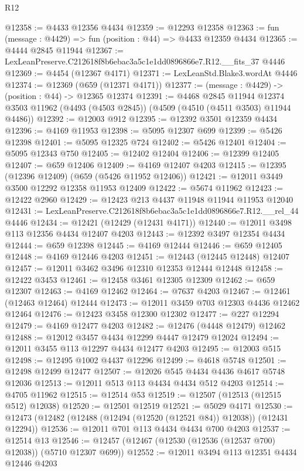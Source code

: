 \begin{lexlean}{R12}
\begin{coremodule}
@12358 := @4433 @12356 @4434
@12359 := @12293 @12358
@12363 := fun (message : @4429) => fun (position : @44) => @4433 @12359 @4434
@12365 := @4444 @2845 @11944
@12367 := LexLeanPreserve.C212618f8b6ebac3a5c1e1dd0896866e7.R12.__fits_37 @4446
@12369 := @4454 (@12367 @4171)
@12371 := LexLeanStd.Blake3.wordAt @4446
@12374 := @12369 (@659 (@12371 @4171))
@12377 := (message : @4429) -> (position : @44) -> @12365 @12374
@12391 := @4468
    @2845
    @11944
    @12374
    @3503
    @11962
    (@4493 (@4503 @2845))
    (@4509 (@4510 (@4511 @3503) @11944 @4486))
@12392 := @12003 @912
@12395 := @12392 @3501 @12359 @4434
@12396 := @4169 @11953
@12398 := @5095 @12307 @699
@12399 := @5426 @12398
@12401 := @5095 @12325 @724
@12402 := @5426 @12401
@12404 := @5095 @12343 @750
@12405 := @12402 @12404
@12406 := @12399 @12405
@12407 := @659 @12406
@12409 := @4169 @12407 @4203
@12415 := @12395 (@12396 @12409) (@659 (@5426 @11952 @12406))
@12421 := @12011 @3449 @3500 @12292 @12358 @11953 @12409
@12422 := @5674 @11962
@12423 := @12422 @2960
@12429 := @12423 @213 @4437 @11948 @11944 @11953 @12040
@12431 := LexLeanPreserve.C212618f8b6ebac3a5c1e1dd0896866e7.R12.__rel_44 @4446
@12434 := @12421 (@12429 (@12431 @4171))
@12440 := @12011 @3498 @113 @12356 @4434 @12407 @4203
@12443 := @12392 @3497 @12354 @4434
@12444 := @659 @12398
@12445 := @4169 @12444
@12446 := @659 @12405
@12448 := @4169 @12446 @4203
@12451 := @12443 (@12445 @12448) @12407
@12457 := @12011 @3462 @3496 @12310 @12353 @12444 @12448
@12458 := @12422 @3453
@12461 := @12458 @3461 @12305 @12309
@12462 := @659 @12307
@12463 := @4169 @12462
@12464 := @7637 @4203
@12467 := @12461 (@12463 @12464) @12444
@12473 := @12011 @3459 @703 @12303 @4436 @12462 @12464
@12476 := @12423 @3458 @12300 @12302
@12477 := @227 @12294
@12479 := @4169 @12477 @4203
@12482 := @12476 (@4448 @12479) @12462
@12488 := @12012 @3457 @4434 @12299 @4447 @12479 @12024
@12494 := @12011 @3455 @113 @12297 @4434 @12477 @4203
@12495 := @12003 @515
@12498 := @12495 @1002 @4437 @12296
@12499 := @4618 @5748
@12501 := @12498 @12499 @12477
@12507 := @12026 @545 @4434 @4436 @4617 @5748 @12036
@12513 := @12011 @513 @113 @4434 @4434 @512 @4203
@12514 := @4705 @11962
@12515 := @12514 @53
@12519 := @12507 (@12513 (@12515 @512) @12038)
@12520 := @12501 @12519
@12521 := @5029 @4171
@12530 := @12473 (@12482 (@12488 (@12494 (@12520 (@12521 @84)) @12038)) (@12431 @12294))
@12536 := @12011 @701 @113 @4434 @4434 @700 @4203
@12537 := @12514 @13
@12546 := @12457 (@12467 (@12530 (@12536 (@12537 @700) @12038)) (@5710 @12307 @699))
@12552 := @12011 @3494 @113 @12351 @4434 @12446 @4203

\end{coremodule}
\end{lexlean}
